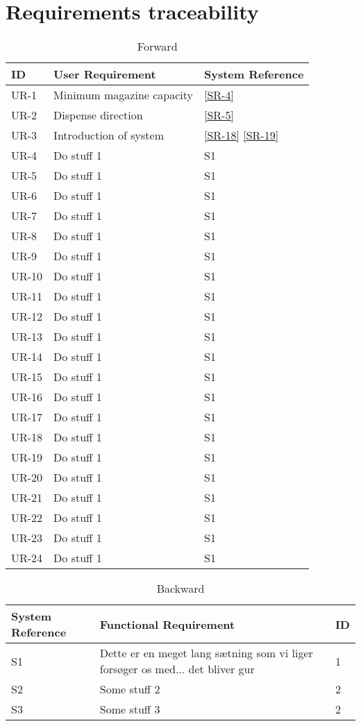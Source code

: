 \documentclass[Main]{subfiles}
\begin{document}
\chapter{Requirements traceability}

\begin{table}[htbp]
	\centering
	\begin{tabular}{l p{10cm} l} \hline
	ID & User Requirement & System Reference \\\hline
	UR-1 & Minimum magazine capacity & \ref{SR-4} \\
	UR-2 & Dispense direction & \ref{SR-5} \\
	UR-3 & Introduction of system &\ref{SR-18} \ref{SR-19} \\
	UR-4 & Do stuff 1 & S1 \\
	UR-5 & Do stuff 1 & S1 \\
	UR-6 & Do stuff 1 & S1 \\
	UR-7 & Do stuff 1 & S1 \\
	UR-8 & Do stuff 1 & S1 \\
	UR-9 & Do stuff 1 & S1 \\
	UR-10 & Do stuff 1 & S1 \\
	UR-11 & Do stuff 1 & S1 \\
	UR-12 & Do stuff 1 & S1 \\
	UR-13 & Do stuff 1 & S1 \\
	UR-14 & Do stuff 1 & S1 \\
	UR-15 & Do stuff 1 & S1 \\
	UR-16 & Do stuff 1 & S1 \\
	UR-17 & Do stuff 1 & S1 \\
	UR-18 & Do stuff 1 & S1 \\
	UR-19 & Do stuff 1 & S1 \\
	UR-20 & Do stuff 1 & S1 \\
	UR-21 & Do stuff 1 & S1 \\
	UR-22 & Do stuff 1 & S1 \\
	UR-23 & Do stuff 1 & S1 \\
	UR-24 & Do stuff 1 & S1 \\\hline
	\end{tabular}

\caption{Forward}
\label{Tab:Forward}
\end{table}


\begin{table}[htbp]
	\centering
	\begin{tabular}{p{3.5cm} p{10cm} l} \hline
	System Reference & Functional Requirement & ID\\\hline
	S1 & Dette er en meget lang sætning som vi liger forsøger os med... det bliver gur & 1 \\
	S2 & Some stuff 2 & 2 \\ 
	S3 & Some stuff 3 & 2\\\hline
	\end{tabular}

\caption{Backward}
\label{Tab:Backward}
\end{table}
\end{document}

